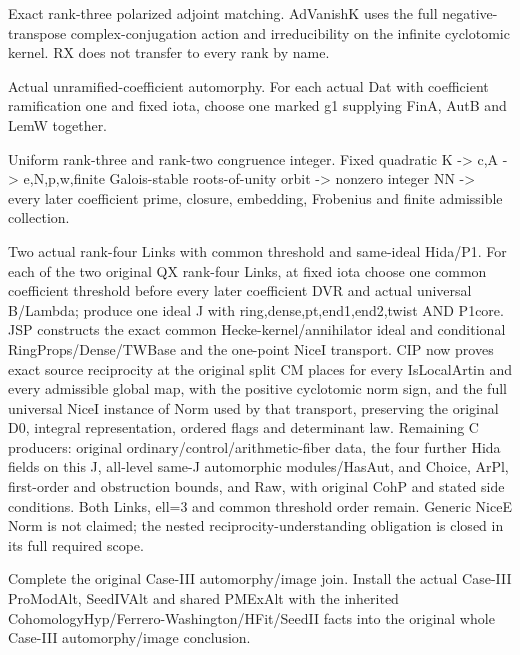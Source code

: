 \begin{description}[style=nextline]
\item[10. AD\_VANISH\_K\_MATCH --- D] Exact rank-three polarized adjoint matching. AdVanishK uses the full negative-transpose complex-conjugation action and irreducibility on the infinite cyclotomic kernel. RX does not transfer to every rank by name.

\item[11. AUT\_UNRAM\_COEF --- C] Actual unramified-coefficient automorphy. For each actual Dat with coefficient ramification one and fixed iota, choose one marked g1 supplying FinA, AutB and LemW together.

\item[12. CNR3 --- C] Uniform rank-three and rank-two congruence integer. Fixed quadratic K -> c,A -> e,N,p,w,finite Galois-stable roots-of-unity orbit -> nonzero integer NN -> every later coefficient prime, closure, embedding, Frobenius and finite admissible collection.

\item[13. COUNT\_II\_SUPPORT --- C] Two actual rank-four Links with common threshold and same-ideal Hida/P1. For each of the two original QX rank-four Links, at fixed iota choose one common coefficient threshold before every later coefficient DVR and actual universal B/Lambda; produce one ideal J with ring,dense,pt,end1,end2,twist AND P1core. JSP constructs the exact common Hecke-kernel/annihilator ideal and conditional RingProps/Dense/TWBase and the one-point NiceI transport. CIP now proves exact source reciprocity at the original split CM places for every IsLocalArtin and every admissible global map, with the positive cyclotomic norm sign, and the full universal NiceI instance of Norm used by that transport, preserving the original D0, integral representation, ordered flags and determinant law. Remaining C producers: original ordinary/control/arithmetic-fiber data, the four further Hida fields on this J, all-level same-J automorphic modules/HasAut, and Choice, ArPl, first-order and obstruction bounds, and Raw, with original CohP and stated side conditions. Both Links, ell=3 and common threshold order remain. Generic NiceE Norm is not claimed; the nested reciprocity-understanding obligation is closed in its full required scope.

\item[14. TASK\_CASE3\_AUT\_JOIN --- B] Complete the original Case-III automorphy/image join. Install the actual Case-III ProModAlt, SeedIVAlt and shared PMExAlt with the inherited CohomologyHyp/Ferrero-Washington/HFit/SeedII facts into the original whole Case-III automorphy/image conclusion.


\end{description}
